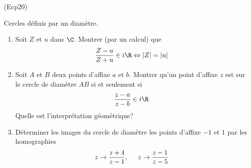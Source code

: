 \begin{tiny}(Ecp20)\end{tiny} Cercles définis par un diamètre. \label{cp20}
\begin{enumerate}
  \item Soit $Z$ et $u$ dans $\C$. Montrer (par un calcul) que
\begin{displaymath}
  \frac{Z-u}{Z+u}\in i\R \Leftrightarrow |Z| = |u|
\end{displaymath}
  \item Soit $A$ et $B$ deux points d'affixe $a$ et $b$. Montrer qu'un point d'affixe $z$ est sur le cercle de diamètre $AB$ si et seulement si
\begin{displaymath}
  \frac{z-a}{z-b}\in i\R
\end{displaymath}
Quelle est l'interprétation géométrique?
  \item Déterminer les images du cercle de diamètre les points d'affixe $-1$ et $1$ par les
homographies
\begin{displaymath}
z \rightarrow \frac{z+4}{z-1}, \hspace{0.5cm}
z \rightarrow \frac{z-1}{z-5}
\end{displaymath}
\end{enumerate}